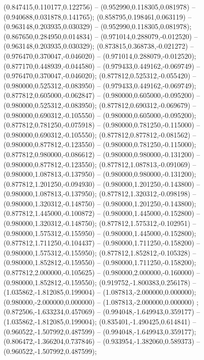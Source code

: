  (0.847415,0.110177,0.122756) -- (0.952990,0.118305,0.081978) -- (0.940688,0.031878,0.141765);
 (0.858795,0.198461,0.063119) -- (0.963148,0.203935,0.030329) -- (0.952990,0.118305,0.081978);
 (0.867650,0.284950,0.014834) -- (0.971014,0.288079,-0.012520) -- (0.963148,0.203935,0.030329);
 (0.873815,0.368738,-0.021272) -- (0.976470,0.370047,-0.046020) -- (0.971014,0.288079,-0.012520);
 (0.877170,0.448939,-0.044580) -- (0.979433,0.449162,-0.069749) -- (0.976470,0.370047,-0.046020);
 (0.877812,0.525312,-0.055420) -- (0.980000,0.525312,-0.083950) -- (0.979433,0.449162,-0.069749);
 (0.877812,0.605000,-0.062847) -- (0.980000,0.605000,-0.095200) -- (0.980000,0.525312,-0.083950);
 (0.877812,0.690312,-0.069679) -- (0.980000,0.690312,-0.105550) -- (0.980000,0.605000,-0.095200);
 (0.877812,0.781250,-0.075918) -- (0.980000,0.781250,-0.115000) -- (0.980000,0.690312,-0.105550);
 (0.877812,0.877812,-0.081562) -- (0.980000,0.877812,-0.123550) -- (0.980000,0.781250,-0.115000);
 (0.877812,0.980000,-0.086612) -- (0.980000,0.980000,-0.131200) -- (0.980000,0.877812,-0.123550);
 (0.877812,1.087813,-0.091069) -- (0.980000,1.087813,-0.137950) -- (0.980000,0.980000,-0.131200);
 (0.877812,1.201250,-0.094930) -- (0.980000,1.201250,-0.143800) -- (0.980000,1.087813,-0.137950);
 (0.877812,1.320312,-0.098198) -- (0.980000,1.320312,-0.148750) -- (0.980000,1.201250,-0.143800);
 (0.877812,1.445000,-0.100872) -- (0.980000,1.445000,-0.152800) -- (0.980000,1.320312,-0.148750);
 (0.877812,1.575312,-0.102951) -- (0.980000,1.575312,-0.155950) -- (0.980000,1.445000,-0.152800);
 (0.877812,1.711250,-0.104437) -- (0.980000,1.711250,-0.158200) -- (0.980000,1.575312,-0.155950);
 (0.877812,1.852812,-0.105328) -- (0.980000,1.852812,-0.159550) -- (0.980000,1.711250,-0.158200);
 (0.877812,2.000000,-0.105625) -- (0.980000,2.000000,-0.160000) -- (0.980000,1.852812,-0.159550);
 (0.919752,-1.800383,0.256178) -- (1.035862,-1.812085,0.199004) -- (1.087813,-2.000000,0.000000);
 (0.980000,-2.000000,0.000000) -- (1.087813,-2.000000,0.000000) ;
 (0.872506,-1.633234,0.457069) -- (0.994048,-1.649943,0.359177) -- (1.035862,-1.812085,0.199004);
 (0.835401,-1.490425,0.614841) -- (0.960522,-1.507992,0.487599) -- (0.994048,-1.649943,0.359177);
 (0.806472,-1.366204,0.737846) -- (0.933954,-1.382060,0.589373) -- (0.960522,-1.507992,0.487599);

